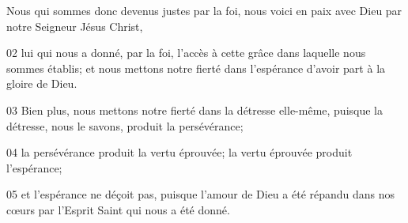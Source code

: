 Nous qui sommes donc devenus justes par la foi, nous voici en paix avec Dieu par notre Seigneur Jésus Christ,

02 lui qui nous a donné, par la foi, l’accès à cette grâce dans laquelle nous sommes établis; et nous mettons notre fierté dans l’espérance d’avoir part à la gloire de Dieu.

03 Bien plus, nous mettons notre fierté dans la détresse elle-même, puisque la détresse, nous le savons, produit la persévérance;

04 la persévérance produit la vertu éprouvée; la vertu éprouvée produit l’espérance;

05 et l’espérance ne déçoit pas, puisque l’amour de Dieu a été répandu dans nos cœurs par l’Esprit Saint qui nous a été donné.
